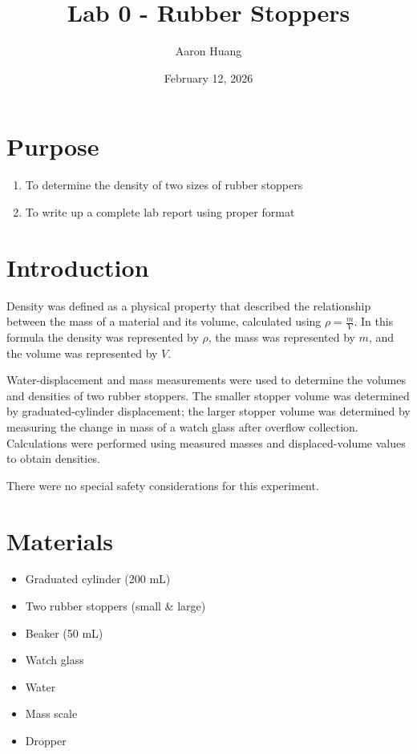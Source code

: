 \documentclass{article}
\begin{document}
\title{Lab 0 - Rubber Stoppers}
\author{Aaron Huang}
\date{February 12, 2026}
\maketitle
\section{Purpose}
\begin{enumerate}
    \item To determine the density of two sizes of rubber stoppers
    \item To write up a complete lab report using proper format
\end{enumerate}
\section{Introduction}

Density was defined as a physical property that described the relationship between the mass of a material and its volume, calculated using  $\rho = \frac{m}{V}$. In this formula the density was represented by $\rho$, the mass was represented by $m$, and the volume was represented by $V$.

Water-displacement and mass measurements were used to determine the volumes and densities of two rubber stoppers. The smaller stopper volume was determined by graduated-cylinder displacement; the larger stopper volume was determined by measuring the change in mass of a watch glass after overflow collection. Calculations were performed using measured masses and displaced-volume values to obtain densities.

There were no special safety considerations for this experiment. 


\section{Materials}
\begin{itemize}
    \item Graduated cylinder (200 mL)
    \item Two rubber stoppers (small \& large)
    \item Beaker (50 mL)
    \item Watch glass
    \item Water
    \item Mass scale
    \item Dropper
\end{itemize}
\newpage
\end{document}
